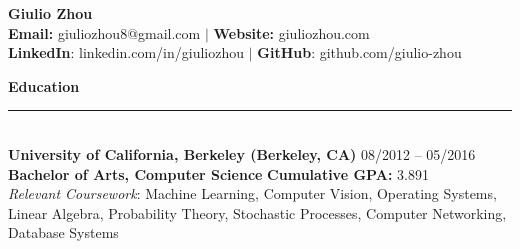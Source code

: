 \documentclass{article}
\begin{document}
\newcommand{\HRule}{\rule{\linewidth}{0.2mm}}


\begin{center}
\textbf{{\LARGE Giulio Zhou}} \\ 
\textbf{\fontsize{11}{13.2} Email:} giuliozhou8@gmail.com  $|$ \textbf{Website:} giuliozhou.com\\
\textbf{LinkedIn}: linkedin.com/in/giuliozhou $|$ \textbf{GitHub}: github.com/giulio-zhou\\[2mm]
\end{center}


\normalsize
\noindent
\textbf{{\Large Education}}\\[-2mm]
\HRule\\
\textbf{University of California, Berkeley (Berkeley, CA)}
\hfill 08/2012 -- 05/2016 \\
\indent
\textbf{Bachelor of Arts, Computer Science}  
\hfill{\textbf{Cumulative GPA: }3.891}\\
\textit{Relevant Coursework}: Machine Learning, Computer Vision, Operating Systems, Linear Algebra, Probability Theory, Stochastic Processes, Computer Networking, Database Systems
\\
\end{document}
